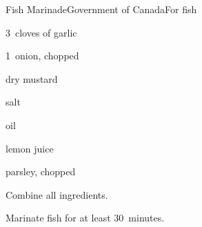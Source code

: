 \begin{recipe}{Fish Marinade}{Government of Canada}{For  fish}

\begin{ingredients}
\item 3~cloves of garlic
\item 1~onion, chopped
\item {} dry mustard
\item {} salt
\item \C{\quarter} oil
\item \C{\quarter} lemon juice
\item \C{\half} parsley, chopped
\end{ingredients}

\begin{directions}
\item Combine all ingredients.
\item Marinate fish for at least 30~minutes.
\end{directions}

\end{recipe}
